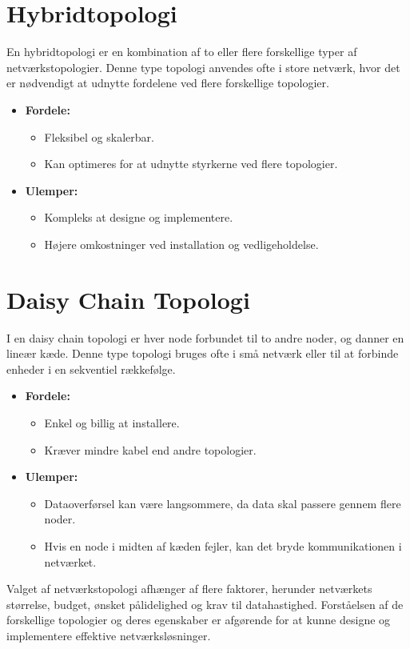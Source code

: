 \section{Hybridtopologi}
En hybridtopologi er en kombination af to eller flere forskellige typer af netværkstopologier. Denne type topologi anvendes ofte i store netværk, hvor det er nødvendigt at udnytte fordelene ved flere forskellige topologier.
\begin{itemize}
	\item \textbf{Fordele:}
	\begin{itemize}
		\item Fleksibel og skalerbar.
		\item Kan optimeres for at udnytte styrkerne ved flere topologier.
	\end{itemize}
	\item \textbf{Ulemper:}
	\begin{itemize}
		\item Kompleks at designe og implementere.
		\item Højere omkostninger ved installation og vedligeholdelse.
	\end{itemize}
\end{itemize}

\section{Daisy Chain Topologi}
I en daisy chain topologi er hver node forbundet til to andre noder, og danner en lineær kæde. Denne type topologi bruges ofte i små netværk eller til at forbinde enheder i en sekventiel rækkefølge.
\begin{itemize}
	\item \textbf{Fordele:}
	\begin{itemize}
		\item Enkel og billig at installere.
		\item Kræver mindre kabel end andre topologier.
	\end{itemize}
	\item \textbf{Ulemper:}
	\begin{itemize}
		\item Dataoverførsel kan være langsommere, da data skal passere gennem flere noder.
		\item Hvis en node i midten af kæden fejler, kan det bryde kommunikationen i netværket.
	\end{itemize}
\end{itemize}
\noindent Valget af netværkstopologi afhænger af flere faktorer, herunder netværkets størrelse, budget, ønsket pålidelighed og krav til datahastighed. Forståelsen af de forskellige topologier og deres egenskaber er afgørende for at kunne designe og implementere effektive netværksløsninger.
\clearpage